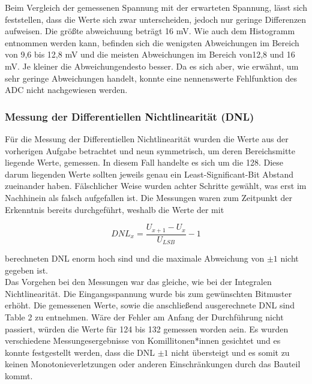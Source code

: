 \documentclass[a4paper,12pt]{article}
\begin{document}
\noindent Beim Vergleich der gemessenen Spannung mit der erwarteten Spannung, lässt sich feststellen, dass die Werte sich zwar unterscheiden, jedoch nur geringe Differenzen aufweisen. Die größte abweichuung beträgt 16 mV. Wie auch dem Histogramm entnommen werden kann, befinden sich die wenigsten Abweichungen im Bereich von 9,6 bis 12,8 mV und die meisten Abweichungen im Bereich von12,8 und 16 mV. Je kleiner die Abweichungendesto besser. Da es sich aber, wie erwähnt, um sehr geringe Abweichungen handelt, konnte eine nennenswerte Fehlfunktion des ADC nicht nachgewiesen werden.

\subsubsection*{Messung der Differentiellen Nichtlinearität (DNL)}
Für die Messung der Differentiellen Nichtlinearität wurden die Werte aus der vorherigen Aufgabe betrachtet und neun symmetrisch, um deren Bereichsmitte liegende Werte, gemessen. In diesem Fall handelte es sich um die 128. Diese darum liegenden Werte sollten jeweils genau ein Least-Significant-Bit Abstand zueinander haben. Fälschlicher Weise wurden achter Schritte gewählt, was erst im Nachhinein als falsch aufgefallen ist. Die Messungen waren zum Zeitpunkt der Erkenntnis bereits durchgeführt, weshalb die Werte der mit

\[
DNL_x = \frac{U_{x+1} - U_x}{U_{LSB}} - 1
\]

\noindent berechneten DNL enorm hoch sind und die maximale Abweichung von $\pm1$ nicht gegeben ist. \\
Das Vorgehen bei den Messungen war das gleiche, wie bei der Integralen Nichtlinearität. Die Eingangsspannung wurde bis zum gewünschten Bitmuster erhöht. Die gemessenen Werte, sowie die anschließend ausgerechnete DNL sind Table 2 zu entnehmen. Wäre der Fehler am Anfang der Durchführung nicht passiert, würden die Werte für  124 bis 132 gemessen worden aein. Es wurden verschiedene Messungesergebnisse von Komillitonen*innen gesichtet und es konnte festgestellt werden, dass die DNL $\pm1$ nicht übersteigt und es somit zu keinen Monotonieverletzungen oder anderen Einschränkungen durch das Bauteil kommt.\\
\end{document}
